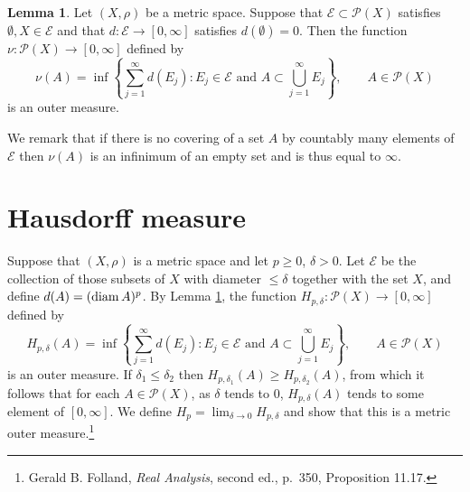 \documentclass{article}
\newcommand{\diam}{\ensuremath\mathrm{diam}\,}
\theoremstyle{definition}
\newtheorem{lemma}[theorem]{Lemma}
\theoremstyle{definition}
\begin{document}
\begin{lemma}
Let $(X,\rho)$ be a metric space.
Suppose that $\mathscr{E} \subset \mathscr{P}(X)$ satisfies $\emptyset, X \in \mathscr{E}$ and that
$d:\mathscr{E} \to [0,\infty]$ satisfies $d(\emptyset)=0$. Then the function $\nu:\mathscr{P}(X) \to [0,\infty]$ defined by
\[
\nu(A) = \inf\left\{\sum_{j=1}^\infty d(E_j): E_j \in \mathscr{E} \textrm{ and } A \subset \bigcup_{j=1}^\infty E_j \right\},
\qquad A \in \mathscr{P}(X)
\]
is an outer measure.
\label{outermeasure}
\end{lemma}

We remark that if there is no covering of a set $A$ by countably many elements of $\mathscr{E}$ then $\nu(A)$ is an infinimum of an empty
set and is thus equal to $\infty$.

 





\section{Hausdorff measure}
Suppose that $(X,\rho)$ is a metric space and let $p \geq 0$, $\delta>0$.
Let $\mathscr{E}$ be the collection of those subsets of $X$ with diameter $\leq \delta$ together with the set $X$,
and define $d(A)=(\diam A)^p$. By Lemma \ref{outermeasure}, the function $H_{p,\delta}:\mathscr{P}(X) \to [0,\infty]$ defined by
\[
H_{p,\delta}(A) = \inf\left\{ \sum_{j=1}^\infty d(E_j): \textrm{$E_j \in \mathscr{E}$ and $A \subset \bigcup_{j=1}^\infty E_j$} \right\},
\qquad A \in \mathscr{P}(X)
\]
is an outer measure.
If $\delta_1 \leq \delta_2$ then $H_{p,\delta_1}(A) \geq H_{p,\delta_2}(A)$, from which it follows that  for each $A \in \mathscr{P}(X)$,
as $\delta$ tends to $0$,
$H_{p,\delta}(A)$ tends to some element of  $[0,\infty]$. We define $H_p=\lim_{\delta \to 0} H_{p,\delta}$ and show that this is a metric
outer measure.\footnote{Gerald B. Folland, {\em Real Analysis}, second ed., p.~350, Proposition 11.17.}
\end{document}
